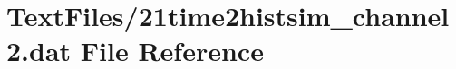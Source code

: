 \hypertarget{21time2histsim__channel2_8dat}{}\section{Text\+Files/21time2histsim\+\_\+channel2.dat File Reference}
\label{21time2histsim__channel2_8dat}
